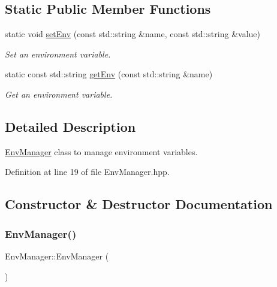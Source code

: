 \subsection*{Static Public Member Functions}
\begin{DoxyCompactItemize}
\item 
static void \hyperlink{classtls_1_1_env_manager_a560e9c9885ae4e656eb7121adc4cbc9a}{set\+Env} (const std\+::string \&name, const std\+::string \&value)
\begin{DoxyCompactList}\small\item\em Set an environment variable. \end{DoxyCompactList}\item 
static const std\+::string \hyperlink{classtls_1_1_env_manager_a505529a47f05f2450594da617d627936}{get\+Env} (const std\+::string \&name)
\begin{DoxyCompactList}\small\item\em Get an environment variable. \end{DoxyCompactList}\end{DoxyCompactItemize}


\subsection{Detailed Description}
\hyperlink{classtls_1_1_env_manager}{Env\+Manager} class to manage environment variables. 

Definition at line 19 of file Env\+Manager.\+hpp.



\subsection{Constructor \& Destructor Documentation}
\mbox{\label{classtls_1_1_env_manager_a73654081360600e2dd650eea02f82a23}} 
\subsubsection{\texorpdfstring{Env\+Manager()}{EnvManager()}\hspace{0.1cm}{\footnotesize\ttfamily [1/2]}}
{\footnotesize\ttfamily Env\+Manager\+::\+Env\+Manager (\begin{DoxyParamCaption}{ }\end{DoxyParamCaption})}



